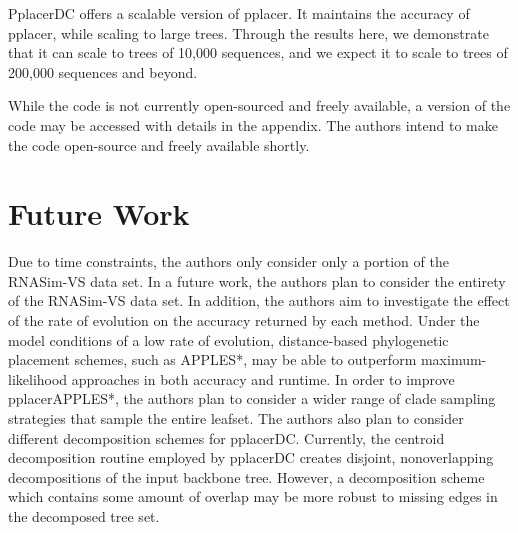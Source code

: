\documentclass[10pt]{article}
\begin{document}
PplacerDC offers a scalable version of pplacer. It maintains the accuracy of pplacer, while scaling to large trees. Through the results here, we demonstrate that it can scale to trees of 10,000 sequences, and we expect it to scale to trees of 200,000 sequences and beyond.

While the code is not currently open-sourced and freely available, a version of the code
may be accessed with details in the appendix.
The authors intend to make the code open-source and freely available shortly.

\section{Future Work}

Due to time constraints, the authors only consider only a portion of the RNASim-VS data set.
In a future work, the authors plan to consider the entirety of the RNASim-VS data set.
In addition, the authors aim to investigate the effect of the rate of evolution on the accuracy
returned by each method.
Under the model conditions of a low rate of evolution, distance-based phylogenetic placement schemes,
such as APPLES*, may be able to outperform maximum-likelihood approaches in both accuracy and runtime.
In order to improve pplacerAPPLES*, the authors plan to consider a wider range of clade sampling
strategies that sample the entire leafset.
The authors also plan to consider different decomposition schemes for pplacerDC.
Currently, the centroid decomposition routine employed by pplacerDC creates disjoint, nonoverlapping
decompositions of the input backbone tree.
However, a decomposition scheme which contains some amount of overlap may be more robust to missing
edges in the decomposed tree set.



\end{document}
